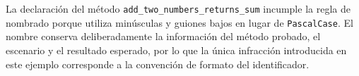 La declaración del método \texttt{add\_two\_numbers\_returns\_sum} incumple la regla de nombrado porque utiliza minúsculas y guiones bajos en lugar de \texttt{PascalCase}. El nombre conserva deliberadamente la información del método probado, el escenario y el resultado esperado, por lo que la única infracción introducida en este ejemplo corresponde a la convención de formato del identificador.
